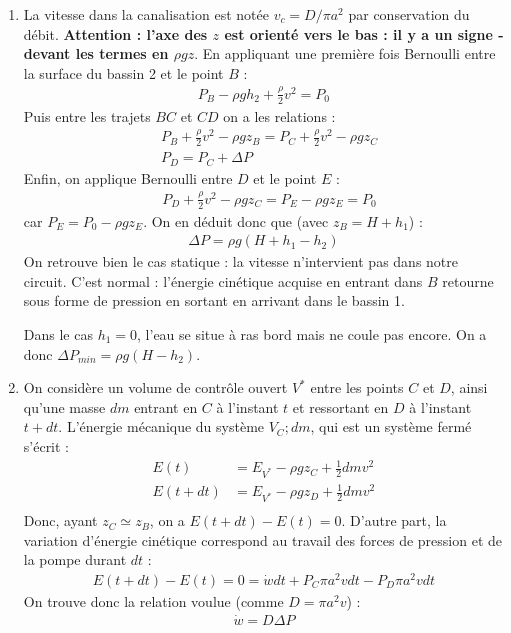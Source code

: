 \begin{correction}
\begin{enumerate}
	\item La vitesse dans la canalisation est notée $v_c=D/\pi a^2$ par conservation du débit. \textbf{Attention : l'axe des $z$ est orienté vers le bas : il y a un signe - devant les termes en $\rho gz$}. En appliquant une première fois Bernoulli entre la surface du bassin 2 et le point $B$ :
	\begin{align*}
		 P_B-\rho g h_2 +\frac{\rho}{2}v^2 = P_0 
	\end{align*}
	Puis entre les trajets $BC$ et $CD$ on a les relations :
		\begin{align*}
		& P_B+\frac{\rho}{2}v^2-\rho g z_B = P_C+\frac{\rho}{2}v^2-\rho g z_C \\
		& P_D= P_C+\Delta P 
	\end{align*}
	Enfin, on applique Bernoulli entre $D$ et le point $E$ :
		\begin{align*}
		& P_D+\frac{\rho}{2}v^2-\rho g z_C= P_E-\rho g z_E = P_0
	\end{align*}	
	car $P_E=P_0-\rho g z_E$. On en déduit donc que (avec $z_B=H+h_1$) :
	\begin{align*}
		\Delta P = \rho g(H+h_1-h_2)
	\end{align*}
	On retrouve bien le cas statique : la vitesse n'intervient pas dans notre circuit. C'est normal : l'énergie cinétique acquise en entrant dans $B$ retourne sous forme de pression en sortant en arrivant dans le bassin 1.
	
	Dans le cas $h_1=0$, l'eau se situe à ras bord mais ne coule pas encore. On a donc $\Delta P_{min}=\rho g(H-h_2)$.
	
	\item On considère un volume de contrôle ouvert $V^\ast$ entre les points $C$ et $D$, ainsi qu'une masse $dm$ entrant en $C$ à l'instant $t$ et ressortant en $D$ à l'instant $t+dt$. L'énergie mécanique du système ${V_C; dm}$, qui est un système fermé s'écrit :
	\begin{align*}
		E(t)&=E_{V^\ast}-\rho g z_C + \frac{1}{2}dm v^2 \\
		E(t+dt)&=E_{V^\ast}-\rho g z_D + \frac{1}{2}dm v^2 \\
	\end{align*}
	Donc, ayant $z_C\simeq z_B$, on a $E(t+dt)-E(t)=0$. D'autre part, la variation d'énergie cinétique correspond au travail des forces de pression et de la pompe durant $dt$ :
	\begin{align*}
	E(t+dt)-E(t)=0=\dot{w}dt+P_C \pi a^2 v dt -P_D\pi a^2 v dt
	\end{align*}
	On trouve donc la relation voulue (comme $D=\pi a^2 v$) :
	\begin{align*}
		\dot{w} = D\Delta P 
	\end{align*}
	

\end{enumerate}
\end{correction}
